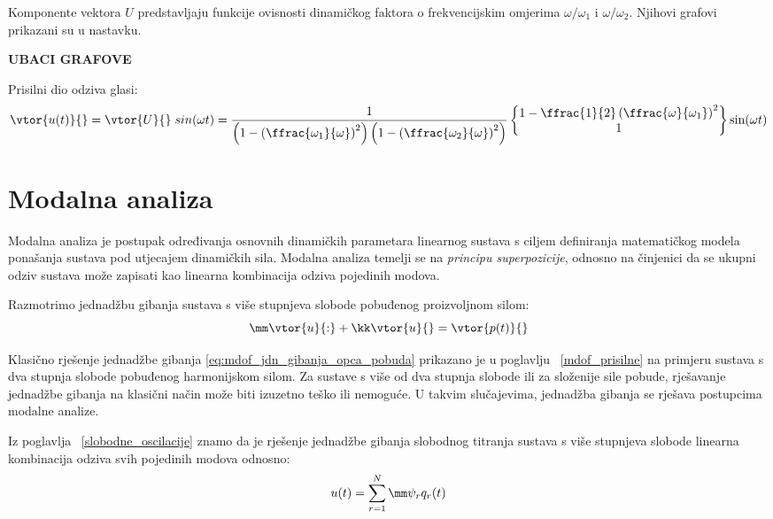 Komponente vektora $U$ predstavljaju funkcije ovisnosti dinamičkog faktora o 
frekvencijskim omjerima $\omega/\omega_1$ i $\omega/\omega_2$. Njihovi grafovi
prikazani su u nastavku.

\textbf{UBACI GRAFOVE}

Prisilni dio odziva glasi:
\begin{equation}
    \begin{split}
        \vtor{u(t)}{} = \vtor{U}{}\; sin(\omega t)
        =
        \frac{1}{\left(1-\left(\ffrac{\omega_1}{\omega}\right)^2\right)\left(1-\left(\ffrac{\omega_2}{\omega}\right)^2\right)}
    \begin{Bmatrix}
        1-\ffrac{1}{2}\left(\ffrac{\omega}{\omega_1}\right)^2\\
        1 
    \end{Bmatrix}
    \sin(\omega t)
    \end{split}
\end{equation}

\section{Modalna analiza}
Modalna analiza je postupak određivanja osnovnih dinamičkih parametara linearnog
sustava s ciljem definiranja matematičkog modela ponašanja sustava pod utjecajem
dinamičkih sila. Modalna analiza temelji se na \textit{principu superpozicije},
odnosno na činjenici da se ukupni odziv sustava može zapisati kao linearna
kombinacija odziva pojedinih modova.
\par

Razmotrimo jednadžbu gibanja sustava s više stupnjeva slobode pobuđenog proizvoljnom
silom:
\begin{equation}\label{eq:mdof_jdn_gibanja_opca_pobuda}
    \mm\vtor{u}{:} + \kk\vtor{u}{} = \vtor{p(t)}{}
\end{equation}

Klasično rješenje jednadžbe gibanja \eqref{eq:mdof_jdn_gibanja_opca_pobuda}
prikazano je u poglavlju ~\ref{mdof_prisilne} na primjeru sustava s dva stupnja 
slobode pobuđenog harmonijskom silom. Za sustave s više od dva stupnja slobode ili
za složenije sile pobude, rješavanje jednadžbe gibanja na klasični način može biti
izuzetno teško ili nemoguće. U takvim slučajevima, jednadžba gibanja se rješava
postupcima modalne analize.
\par

Iz poglavlja ~\ref{slobodne_oscilacije} znamo da je rješenje jednadžbe gibanja
slobodnog titranja sustava s više stupnjeva slobode linearna kombinacija
odziva svih pojedinih modova odnosno:
\begin{equation}\label{eq:mdf_ukupno_rjesenje}
    u(t)=\sum_{r=1}^N\mm\psi_rq_r(t)
\end{equation}

